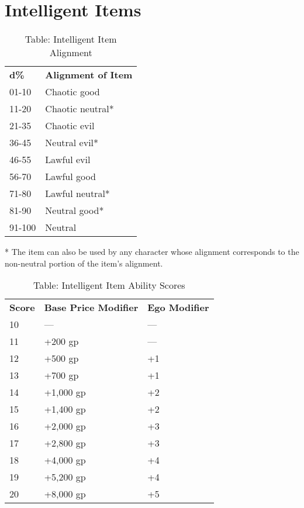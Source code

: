 \section{Intelligent Items}

\label{f0}
\begin{table}[]
\sffamily
\caption{Table: Intelligent Item Alignment}
\begin{tabular}{ll}
\textbf{d\%} & \textbf{Alignment of Item}\\
01-10 & Chaotic good \\
 11-20 & Chaotic neutral* \\
 21-35 & Chaotic evil \\
 36-45 & Neutral evil* \\
 46-55 & Lawful evil \\
 56-70 & Lawful good \\
 71-80 & Lawful neutral* \\
 81-90 & Neutral good* \\
 91-100 & Neutral\\
\end{tabular}
* The item can also be used by any character whose alignment corresponds to the non-neutral portion of the item's alignment.\\
\end{table}

\begin{table}[]
\sffamily
\caption{Table: Intelligent Item Ability Scores}
\begin{tabular}{lll}
\textbf{Score} & \textbf{Base Price Modifier} & \textbf{Ego Modifier}\\
10 &  --- &  --- \\
 11 &  +200 gp &  --- \\
 12 &  +500 gp &  +1 \\
 13 &  +700 gp &  +1 \\
 14 &  +1,000 gp &  +2 \\
 15 &  +1,400 gp &  +2 \\
 16 &  +2,000 gp &  +3 \\
 17 &  +2,800 gp &  +3 \\
 18 &  +4,000 gp &  +4 \\
 19 &  +5,200 gp &  +4 \\
 20 &  +8,000 gp &  +5\\
\end{tabular}
\end{table}

